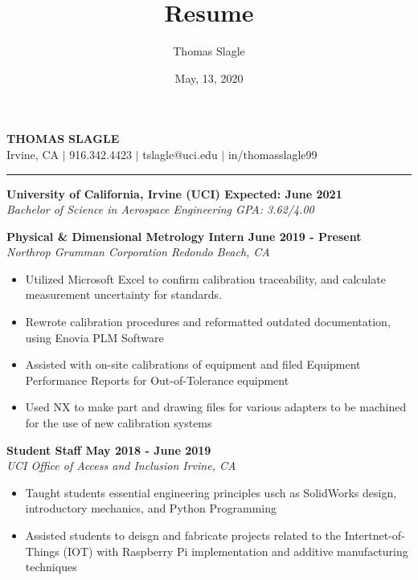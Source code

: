 \documentclass[10pt]{article}
\newcommand{\doublerule}[1][.4pt]{%
  \noindent
  \makebox[0pt][l]{\rule[.7ex]{\linewidth}{#1}}%
  \rule[.3ex]{\linewidth}{#1}}
\begin{document}
\title{Resume}
\author{Thomas Slagle}
\date{May, 13, 2020}

\thispagestyle{empty}
\pagestyle{empty}


\begin{center}
    {\LARGE\textbf{T}\Large\textbf{HOMAS} \LARGE\textbf{S}\Large\textbf{LAGLE}} \\
    Irvine, CA $\mid$ 916.342.4423 $\mid$ tslagle@uci.edu $\mid$ in/thomasslagle99
    \doublerule[1pt]
\end{center}

\myrule

\noindent\textbf{University of California, Irvine (UCI) \hfill Expected: June 2021}\\
\textit{Bachelor of Science in Aerospace Engineering \hfill GPA: 3.62/4.00}

\vspace{0.15in}

\myrule
\noindent\textbf{Physical \& Dimensional Metrology Intern \hfill June 2019 - Present}\\
\textit{Northrop Grumman Corporation \hfill Redondo Beach, CA}
\begin{itemize}
    \item Utilized Microsoft Excel to confirm calibration traceability, and calculate measurement uncertainty for standards.
    \item Rewrote calibration procedures and reformatted outdated documentation, using Enovia PLM Software
    \item Assisted with on-site calibrations of equipment and filed Equipment Performance Reports for Out-of-Tolerance equipment
    \item Used NX to make part and drawing files for various adapters to be machined for the use of new calibration systems
\end{itemize}

\vspace{0.08in}

\noindent\textbf{Student Staff \hfill May 2018 - June 2019}\\
\textit{UCI Office of Access and Inclusion  \hfill Irvine, CA}
\begin{itemize}
    \item Taught students essential engineering principles usch as SolidWorks design, introductory mechanics, and Python Programming
    \item Assisted students to deisgn and fabricate projects related to the Intertnet-of-Things (IOT) with Raspberry Pi implementation and additive manufacturing techniques
\end{itemize}
\end{document}
